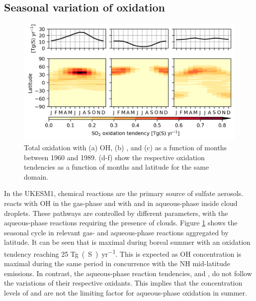 \subsection{Seasonal variation of oxidation}

\begin{figure}
    \centering
    \includegraphics{Chapter4/Figs/seasonal_oxidation_w_summary_histsst_pothole.png}
    \caption[Total tropospheric  oxidation tendencies as a function of latitude and months between 1960 and 1989]{Total  oxidation with (a) OH, (b) , and (c)  as a function of months between 1960 and 1989. (d-f) show the respective oxidation tendencies as a function of months and latitude for the same domain.}
    \label{fig:ch4:seasonal-oxidation}
\end{figure}

In the UKESM1, chemical reactions are the primary source of sulfate aerosols.  reacts with OH in the gas-phase and with  and  in aqueous-phase inside cloud droplets. These pathways are controlled by different parameters, with the aqueous-phase reactions requiring the presence of clouds. Figure \ref{fig:ch4:seasonal-oxidation} shows the seasonal cycle in relevant gas- and aqueous-phase reactions aggregated by latitude. It can be seen that  is maximal during boreal summer with an oxidation tendency reaching 25 \unit{Tg(S)~yr^{-1}}. This is expected as OH concentration is maximal during the same period in concurrence with the NH mid-latitude  emissions. In contrast, the aqueous-phase reaction tendencies,  and , do not follow the variations of their respective oxidants. This implies that the concentration levels of  and  are not the limiting factor for aqueous-phase oxidation in summer.  

